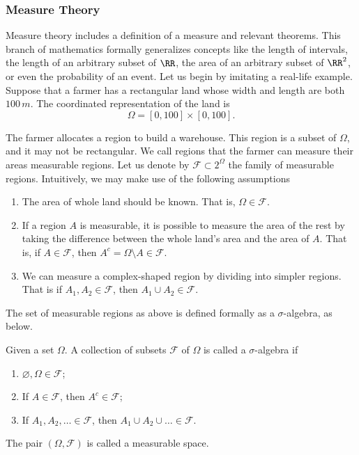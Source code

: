 \subsubsection{Measure Theory}
Measure theory includes a definition of a measure and relevant theorems. This branch of mathematics formally generalizes concepts like the length of intervals, the length of an arbitrary subset of $\RR$, the area of an arbitrary subset of $\RR^2$, or even the probability of an event. Let us begin by imitating a real-life example. Suppose that a farmer has a rectangular land whose width and length are both $100\,m$. The coordinated representation of the land is
$$\Omega=[0,100]\times[0,100].$$

The farmer allocates a region to build a warehouse. This region is a subset of $\Omega$, and it may not be rectangular. We call regions that the farmer can measure their areas measurable regions. Let us denote by $\mathcal{F}\subset 2^\Omega$ the family of measurable regions. Intuitively, we may make use of the following assumptions

\begin{enumerate}
  \item The area of whole land should be known. That is, $\Omega\in\mathcal{F}.$
  \item If a region $A$ is measurable, it is possible to measure the area of the rest by taking the difference between the whole land's area and the area of $A$. That is, if $A\in\mathcal{F}$, then $A^c=\Omega\setminus A\in\mathcal{F}$.
  \item We can measure a complex-shaped region by dividing into simpler regions. That is if $A_1,A_2\in\mathcal{F}$, then $A_1\cup A_2\in\mathcal{F}$.
\end{enumerate}

The set of measurable regions as above is defined formally as a $\sigma$-algebra, as below.

\begin{definition}
  \label{definition:sigma-algebra}
  Given a set $\Omega$. A collection of subsets $\mathcal{F}$ of $\Omega$ is called a $\sigma$-algebra if
  \begin{enumerate}
    \item $\varnothing, \Omega\in\mathcal{F}$;
    \item If $A\in\mathcal{F}$, then $A^c\in\mathcal{F}$;
    \item If $A_1,A_2,\ldots\in\mathcal{F}$, then $A_1\cup A_2\cup\ldots\in\mathcal{F}$.
  \end{enumerate}
  The pair $(\Omega, \mathcal{F})$ is called a measurable space.
\end{definition}

